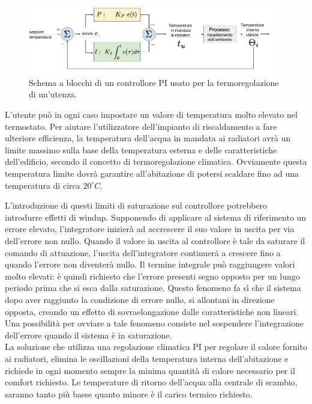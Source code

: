 \documentclass[laurea,oneside,11pt]{USiena_tesiLM3}
\begin{document}
\begin{figure}[!ht]
\centering
\includegraphics[width=0.95\textwidth]{figure/PI} 
\caption{Schema a blocchi di un controllore PI usato per la termoregolazione di un'utenza.}
\label{fig:PI}
\end{figure}
   
L'utente può in ogni caso impostare un valore di temperatura molto elevato nel termostato. Per aiutare l'utilizzatore dell'impianto di riscaldamento a fare ulteriore efficienza, la temperatura dell'acqua in mandata ai radiatori avrà un limite massimo sulla base della temperatura esterna e delle caratteristiche dell'edificio, secondo il concetto di termoregolazione climatica. 
Ovviamente questa temperatura limite dovrà garantire all'abitazione di potersi scaldare fino ad una temperatura di circa $20 ^{\circ}C$.

L'introduzione di questi limiti di saturazione sul controllore potrebbero introdurre effetti di windup.
Supponendo di applicare al sistema di riferimento un errore elevato, l'integratore inizierà ad accrescere il suo valore in uscita per via dell'errore non nullo. Quando il valore in uscita al controllore è tale da saturare il comando di attuazione, l'uscita dell'integratore continuerà a crescere fino a quando l'errore non diventerà nullo.
Il termine integrale può raggiungere valori molto elevati: è quindi richiesto che l'errore presenti segno opposto per un lungo periodo prima che si esca dalla saturazione. 
Questo fenomeno fa sì che il sistema dopo aver raggiunto la condizione di errore nullo, si allontani in direzione opposta, creando un effetto di sovraelongazione dalle caratteristiche non lineari. Una possibilità per ovviare a tale fenomeno consiste nel sospendere l'integrazione dell'errore quando il sistema è in saturazione.\\


La soluzione che utilizza una regolazione climatica PI per regolare il calore fornito ai radiatori, elimina le oscillazioni della temperatura interna dell'abitazione e richiede in ogni momento sempre la minima quantità di calore necessario per il comfort richiesto. Le temperature di ritorno dell'acqua alla centrale di scambio, saranno tanto più basse quanto minore è il carico termico richiesto. 
\end{document}
